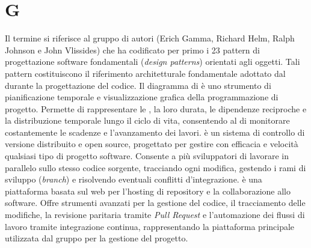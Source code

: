 \section{G}
Il termine  si riferisce al gruppo di autori (Erich Gamma, Richard Helm, Ralph Johnson e John Vlissides) che ha codificato per primo i 23 pattern di progettazione software fondamentali (\emph{design patterns}) orientati agli oggetti. Tali pattern costituiscono il riferimento architetturale fondamentale adottato dal  durante la progettazione del codice.
Il diagramma di  è uno strumento di pianificazione temporale e visualizzazione grafica della programmazione di progetto. Permette di rappresentare le , la loro durata, le dipendenze reciproche e la distribuzione temporale lungo il ciclo di vita, consentendo al  di monitorare costantemente le scadenze e l'avanzamento dei lavori.
 è un sistema di controllo di versione distribuito e open source, progettato per gestire con efficacia e velocità qualsiasi tipo di progetto software. Consente a più sviluppatori di lavorare in parallelo sullo stesso codice sorgente, tracciando ogni modifica, gestendo i rami di sviluppo (\emph{branch}) e risolvendo eventuali conflitti d'integrazione.
 è una piattaforma basata sul web per l'hosting di repository  e la collaborazione allo  software. Offre strumenti avanzati per la gestione del codice, il tracciamento delle modifiche, la revisione paritaria tramite \emph{Pull Request} e l'automazione dei flussi di lavoro tramite integrazione continua, rappresentando la piattaforma principale utilizzata dal gruppo per la gestione del progetto.
